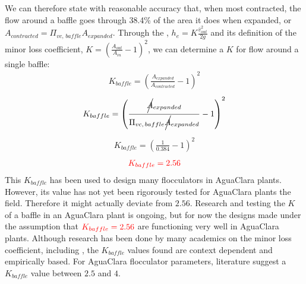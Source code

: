 \documentclass[letterpaper,10pt,english]{sphinxmanual}
\begin{document}
We can therefore state with reasonable accuracy that, when most contracted, the flow around a baffle goes through 38.4\% of the area it does when expanded, or \(A_{contracted} = \Pi_{vc, \, baffle} A_{expanded}\). Through the {\hyperref[\detokenize{Review/Review_Fluid_Mechanics:heading-minor-losses}]{}},
\(h_e = K \frac{\bar v_{out}^2}{2g}\) and its definition of the minor loss coefficient, \(K = \left( \frac{A_{out}}{A_{in}} -1 \right)^2\), we can determine a \(K\) for flow around a single baffle:
\begin{equation}\label{equation:Flocculation/Floc_Design:Flocculation/Floc_Design:7}
\begin{split}K_{baffle} = \left( \frac{A_{expanded}}{A_{contracted}} -1 \right)^2\end{split}
\end{equation}\begin{equation}\label{equation:Flocculation/Floc_Design:Flocculation/Floc_Design:8}
\begin{split}K_{baffle} = \left( \frac{\rlap{\Big/} A_{expanded}}{\Pi_{vc, \, baffle} \rlap{\Big/} A_{expanded}} -1 \right)^2\end{split}
\end{equation}\begin{equation}\label{equation:Flocculation/Floc_Design:Flocculation/Floc_Design:9}
\begin{split}K_{baffle} = \left( \frac{1}{0.384} -1 \right)^2\end{split}
\end{equation}\begin{equation}\label{equation:Flocculation/Floc_Design:Flocculation/Floc_Design:10}
\begin{split}\color{red}{
K_{baffle} = 2.56
}\end{split}
\end{equation}
This \(K_{baffle}\) has been used to design many flocculators in AguaClara plants. However, its value has not yet been rigorously tested for AguaClara plants the field. Therefore it might actually deviate from \(2.56\). Research and testing the \(K\) of a baffle in an AguaClara plant is ongoing, but for now the designs made under the assumption that \(\color{red}{K_{baffle} = 2.56}\) are functioning very well in AguaClara plants. Although research has been done by many academics on the minor loss coefficient, including , the \(K_{baffle}\) values found are context dependent and empirically based. For AguaClara flocculator parameters, literature suggest a \(K_{baffle}\) value between \(2.5\) and \(4\).
\end{document}
